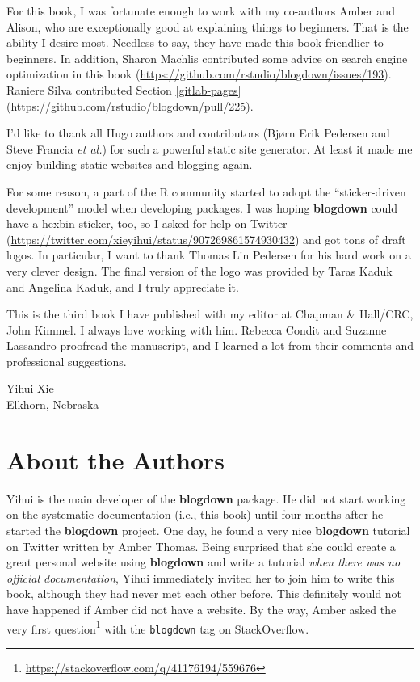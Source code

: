 \documentclass[
  12pt,
]{krantz}
\renewcommand{\href}[2]{#2\footnote{\url{#1}}}
\begin{document}
For this book, I was fortunate enough to work with my co-authors Amber and Alison, who are exceptionally good at explaining things to beginners. That is the ability I desire most. Needless to say, they have made this book friendlier to beginners. In addition, Sharon Machlis contributed some advice on search engine optimization in this book (\url{https://github.com/rstudio/blogdown/issues/193}). Raniere Silva contributed Section \ref{gitlab-pages} (\url{https://github.com/rstudio/blogdown/pull/225}).

I'd like to thank all Hugo authors and contributors (Bjørn Erik Pedersen and Steve Francia \emph{et al.}) for such a powerful static site generator. At least it made me enjoy building static websites and blogging again.

For some reason, a part of the R community started to adopt the ``sticker-driven development'' model when developing packages. I was hoping \textbf{blogdown} could have a hexbin sticker, too, so I asked for help on Twitter (\url{https://twitter.com/xieyihui/status/907269861574930432}) and got tons of draft logos. In particular, I want to thank Thomas Lin Pedersen for his hard work on a very clever design. The final version of the logo was provided by Taras Kaduk and Angelina Kaduk, and I truly appreciate it.

This is the third book I have published with my editor at Chapman \& Hall/CRC, John Kimmel. I always love working with him. Rebecca Condit and Suzanne Lassandro proofread the manuscript, and I learned a lot from their comments and professional suggestions.

\begin{flushright}
Yihui Xie\\
Elkhorn, Nebraska
\end{flushright}

\hypertarget{author}{%
\chapter*{About the Authors}\label{author}}


Yihui is the main developer of the \textbf{blogdown} package. He did not start working on the systematic documentation (i.e., this book) until four months after he started the \textbf{blogdown} project. One day, he found a very nice \textbf{blogdown} tutorial on Twitter written by Amber Thomas. Being surprised that she could create a great personal website using \textbf{blogdown} and write a tutorial \emph{when there was no official documentation}, Yihui immediately invited her to join him to write this book, although they had never met each other before. This definitely would not have happened if Amber did not have a website. By the way, Amber asked \href{https://stackoverflow.com/q/41176194/559676}{the very first question} with the \texttt{blogdown} tag on StackOverflow.
\end{document}
